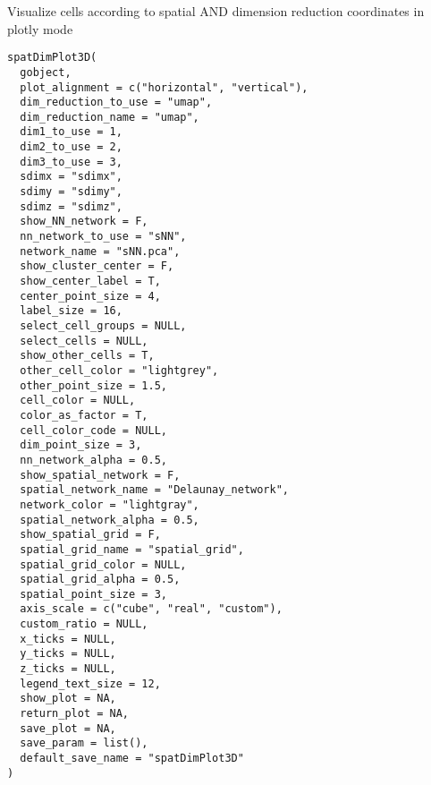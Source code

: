 \documentclass[a4paper]{book}
\begin{document}
%
\begin{Description}\relax
Visualize cells according to spatial AND dimension reduction coordinates in plotly mode
\end{Description}
%
\begin{Usage}
\begin{verbatim}
spatDimPlot3D(
  gobject,
  plot_alignment = c("horizontal", "vertical"),
  dim_reduction_to_use = "umap",
  dim_reduction_name = "umap",
  dim1_to_use = 1,
  dim2_to_use = 2,
  dim3_to_use = 3,
  sdimx = "sdimx",
  sdimy = "sdimy",
  sdimz = "sdimz",
  show_NN_network = F,
  nn_network_to_use = "sNN",
  network_name = "sNN.pca",
  show_cluster_center = F,
  show_center_label = T,
  center_point_size = 4,
  label_size = 16,
  select_cell_groups = NULL,
  select_cells = NULL,
  show_other_cells = T,
  other_cell_color = "lightgrey",
  other_point_size = 1.5,
  cell_color = NULL,
  color_as_factor = T,
  cell_color_code = NULL,
  dim_point_size = 3,
  nn_network_alpha = 0.5,
  show_spatial_network = F,
  spatial_network_name = "Delaunay_network",
  network_color = "lightgray",
  spatial_network_alpha = 0.5,
  show_spatial_grid = F,
  spatial_grid_name = "spatial_grid",
  spatial_grid_color = NULL,
  spatial_grid_alpha = 0.5,
  spatial_point_size = 3,
  axis_scale = c("cube", "real", "custom"),
  custom_ratio = NULL,
  x_ticks = NULL,
  y_ticks = NULL,
  z_ticks = NULL,
  legend_text_size = 12,
  show_plot = NA,
  return_plot = NA,
  save_plot = NA,
  save_param = list(),
  default_save_name = "spatDimPlot3D"
)
\end{verbatim}
\end{Usage}
%
\end{document}
